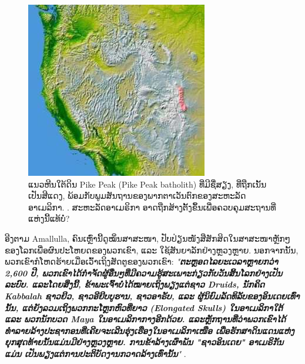 \documentclass[10pt,twocolumn,letterpaper]{article}
\begin{document}
\begin{figure}[t]
\begin{center}
   \includegraphics[width=1\linewidth]{pike.jpg}
\end{center}
   \caption{ແນວຫີນໃຕ້ດິນ Pike Peak (Pike Peak batholith) ທີ່ມີຊື່ສຽງ, ທີ່ຖືກເນັ້ນເປັນສີແດງ, ພ້ອມກັບພູມສັນຖານຂອງພາກຕາເວັນຕົກຂອງສະຫະລັດອາເມລິກາ. \cite{36}.
ສະຫະລັດອາເມຣິກາ ອາດຖືກສ້າງຕັ້ງຂຶ້ນເພື່ອຄວບຄຸມສະຖານທີ່ແຫ່ງນີ້ແທ້ບໍ່? \cite{163}}
\label{fig:11}
\label{fig:onecol}
\end{figure}

ອີງຕາມ Amallulla, ຄົນເຫຼົ່ານີ້ດູໝິ່ນສາສະໜາ, ປັບປ່ຽນໜັງສືສັກສິດໃນສາສະໜາຫຼັກໆຂອງໂລກເພື່ອຜົນປະໂຫຍດຂອງພວກເຂົາ, ແລະ ໃຊ້ສັນຍາລັກຢ່າງຫຼວງຫຼາຍ. \cite{164}
ນອກຈາກນັ້ນ, ພວກເຂົາກໍໂຫດຮ້າຍເມື່ອເວົ້າເຖິງສັດຕູຂອງພວກເຂົາ: \textit{"\textbf{ຕະຫຼອດໄລຍະເວລາຫຼາຍກວ່າ 2,600 ປີ, ພວກເຂົາໄດ້ກຳຈັດຜູ້ອື່ນໆທີ່ມີຄວາມຮູ້ສະເພາະກ່ຽວກັບວັນສິ້ນໂລກຢ່າງເປັນລະບົບ. ແລະໂດຍສິ່ງນີ້, ຂ້າພະເຈົ້າບໍ່ໄດ້ໝາຍເຖິງພຽງແຕ່ຊາວ Druids, ນັກຄິດ Kabbalah ຊາວຢິວ, ຊາວອີຢິບບູຮານ, ຊາວອາຣັບ, ແລະ ຜູ້ນິຍົມລັດທິລັບຂອງອິນເດຍເທົ່ານັ້ນ, ແຕ່ຍັງລວມເຖິງພວກກະໂຫຼກຫົວທີ່ຍາວ (Elongated Skulls) ໃນອາເມລິກາໃຕ້ ແລະ ພວກນັກບວດ Maya ໃນອາເມລິກາກາງອີກດ້ວຍ. ແລະຫຼັກຖານທີ່ວ່າພວກເຂົາໄດ້ທຳລາຍລ້າງປະຊາກອນທີ່ເຄີຍຈະເລີນຮຸ່ງເຮືອງໃນອາເມລິກາເໜືອ ເພື່ອຮັກສາດິນແດນແຫ່ງຍຸກສຸດທ້າຍນັ້ນແມ່ນມີຢ່າງຫຼວງຫຼາຍ. ການຂ້າລ້າງເຜົ່າພັນ "ຊາວອິນເດຍ" ອາເມຣິກັນ ແມ່ນ \cite{165} ເປັນພຽງແຕ່ການປະຕິບັດງານກວາດລ້າງເທົ່ານັ້ນ}"} \cite{33,34}.
\end{document}
